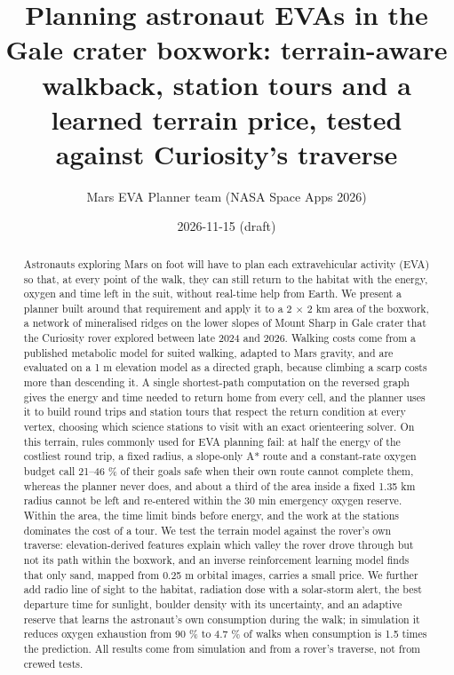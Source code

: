 \documentclass[11pt,a4paper]{article}
\title{Planning astronaut EVAs in the Gale crater boxwork: terrain-aware walkback, station tours and a learned terrain price, tested against Curiosity's traverse}
\author{Mars EVA Planner team (NASA Space Apps 2026)}
\date{2026-11-15 (draft)}
\begin{document}
\maketitle

\begin{abstract}

Astronauts exploring Mars on foot will have to plan each extravehicular activity (EVA) so that, at every point of the walk, they can still return to the habitat with the energy, oxygen and time left in the suit, without real-time help from Earth. We present a planner built around that requirement and apply it to a 2 $\times$ 2 km area of the boxwork, a network of mineralised ridges on the lower slopes of Mount Sharp in Gale crater that the Curiosity rover explored between late 2024 and 2026. Walking costs come from a published metabolic model for suited walking, adapted to Mars gravity, and are evaluated on a 1 m elevation model as a directed graph, because climbing a scarp costs more than descending it. A single shortest-path computation on the reversed graph gives the energy and time needed to return home from every cell, and the planner uses it to build round trips and station tours that respect the return condition at every vertex, choosing which science stations to visit with an exact orienteering solver. On this terrain, rules commonly used for EVA planning fail: at half the energy of the costliest round trip, a fixed radius, a slope-only A* route and a constant-rate oxygen budget call 21--46 \% of their goals safe when their own route cannot complete them, whereas the planner never does, and about a third of the area inside a fixed 1.35 km radius cannot be left and re-entered within the 30 min emergency oxygen reserve. Within the area, the time limit binds before energy, and the work at the stations dominates the cost of a tour. We test the terrain model against the rover's own traverse: elevation-derived features explain which valley the rover drove through but not its path within the boxwork, and an inverse reinforcement learning model finds that only sand, mapped from 0.25 m orbital images, carries a small price. We further add radio line of sight to the habitat, radiation dose with a solar-storm alert, the best departure time for sunlight, boulder density with its uncertainty, and an adaptive reserve that learns the astronaut's own consumption during the walk; in simulation it reduces oxygen exhaustion from 90 \% to 4.7 \% of walks when consumption is 1.5 times the prediction. All results come from simulation and from a rover's traverse, not from crewed tests.

\end{abstract}
\end{document}
